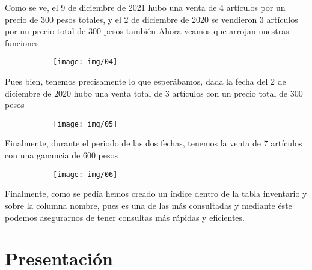 \documentclass[letterpaper,12pt]{article}
\begin{document}
	Como se ve, el 9 de diciembre de 2021 hubo una venta de 4 artículos por un precio de 300 pesos totales, y el 2 de diciembre de 2020 se vendieron 3 artículos por un precio total de 300 pesos también
	Ahora veamos que arrojan nuestras funciones
	
	\begin{figure}[H]

		\begin{subfigure}{20cm}

			\centering

			\texttt{[image: img/04]}

		\end{subfigure}

	\end{figure}
	
	Pues bien, tenemos precisamente lo que esperábamos, dada la fecha del 2 de diciembre de 2020 hubo una venta total de 3 artículos con un precio total de 300 pesos 
	
	\begin{figure}[H]

		\begin{subfigure}{20cm}

			\centering

			\texttt{[image: img/05]}

		\end{subfigure}

	\end{figure}
	
	Finalmente, durante el periodo de las dos fechas, tenemos la venta de 7 artículos con una ganancia de 600 pesos
	
	\begin{figure}[H]

		\begin{subfigure}{20cm}

			\centering

			\texttt{[image: img/06]}

		\end{subfigure}

	\end{figure}

	Finalmente, como se pedía hemos creado un índice dentro de la tabla inventario y sobre la columna nombre, pues es una de las más consultadas y mediante éste podemos asegurarnos de tener consultas más rápidas y eficientes. 
	
	
	
	\section{Presentación}
	
\end{document}
